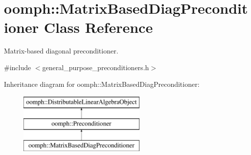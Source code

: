 \hypertarget{classoomph_1_1MatrixBasedDiagPreconditioner}{}\section{oomph\+:\+:Matrix\+Based\+Diag\+Preconditioner Class Reference}
\label{classoomph_1_1MatrixBasedDiagPreconditioner}


Matrix-\/based diagonal preconditioner.  




{\ttfamily \#include $<$general\+\_\+purpose\+\_\+preconditioners.\+h$>$}

Inheritance diagram for oomph\+:\+:Matrix\+Based\+Diag\+Preconditioner\+:\begin{figure}[H]
\begin{center}
\leavevmode
\includegraphics[height=3.000000cm]{classoomph_1_1MatrixBasedDiagPreconditioner}
\end{center}
\end{figure}
